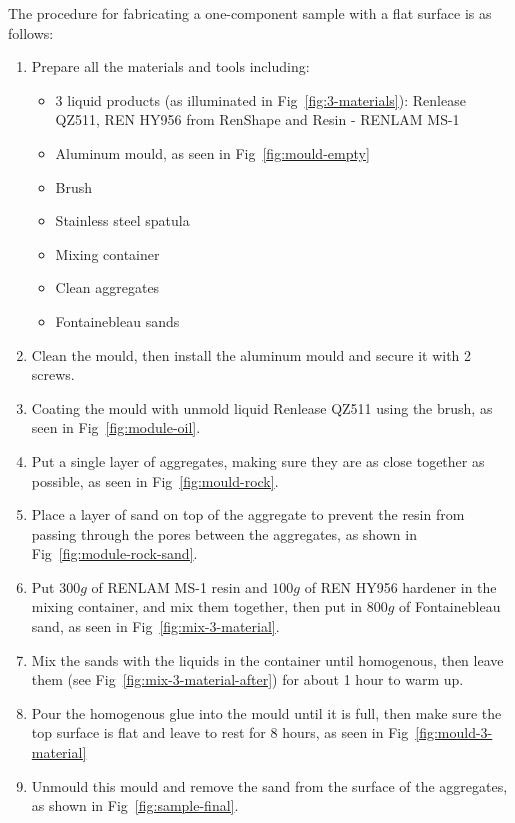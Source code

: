 The procedure for fabricating a one-component sample with a flat surface is as follows:
\begin{enumerate}
    \item Prepare all the materials and tools including:
          \begin{itemize}
              \item 3 liquid products (as illuminated in Fig~\ref{fig:3-materials}): Renlease QZ511, REN HY956 from RenShape and Resin - RENLAM MS-1
              \item Aluminum mould, as seen in Fig~\ref{fig:mould-empty}
              \item Brush
              \item Stainless steel spatula
              \item Mixing container
              \item Clean aggregates
              \item Fontainebleau sands
          \end{itemize}

    \item Clean the mould, then install the aluminum mould and secure it with 2 screws.
    \item Coating the mould with unmold liquid Renlease QZ511 using the brush, as seen in Fig~\ref{fig:module-oil}.
    \item Put a single layer of aggregates, making sure they are as close together as possible, as seen in Fig~\ref{fig:mould-rock}.
    \item Place a layer of sand on top of the aggregate to prevent the resin from passing through the pores between the aggregates, as shown in Fig~\ref{fig:module-rock-sand}.
    \item Put $300g$ of RENLAM MS-1 resin and $100g$ of REN HY956 hardener in the mixing container, and mix them together, then put in $800g$ of Fontainebleau sand, as seen in Fig~\ref{fig:mix-3-material}.
    \item Mix the sands with the liquids in the container until homogenous, then leave them (see Fig~\ref{fig:mix-3-material-after}) for about 1 hour to warm up.
    \item Pour the homogenous glue into the mould until it is full, then make sure the top surface is flat and leave to rest for 8 hours, as seen in Fig~\ref{fig:mould-3-material}
    \item Unmould this mould and remove the sand from the surface of the aggregates, as shown in Fig~\ref{fig:sample-final}.
\end{enumerate}


